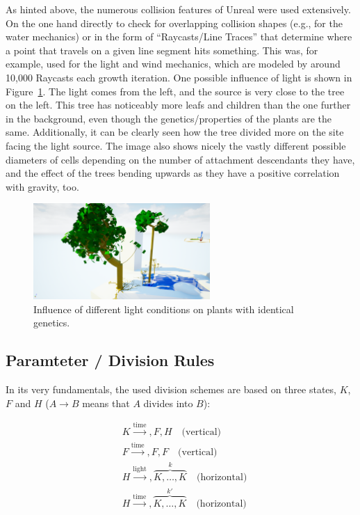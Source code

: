 \documentclass[11pt, abstract=on]{scrartcl}
\begin{document}
As hinted above, the numerous collision features of Unreal were used extensively. On the one hand directly to check for overlapping collision shapes (e.g., for the water mechanics) or in the form of ``Raycasts/Line Traces'' that determine where a point that travels on a given line segment hits something. This was, for example, used for the light and wind mechanics, which are modeled by around 10,000 Raycasts each growth iteration.
One possible influence of light is shown in Figure~\ref{fig:GrowToLight}. The light comes from the left, and the source is very close to the tree on the left. This tree has noticeably more leafs and children than the one further in the background, even though the genetics/properties of the plants are the same. Additionally, it can be clearly seen how the tree divided more on the site facing the light source. The image also shows nicely the vastly different possible diameters of cells depending on the number of attachment descendants they have, and the effect of the trees bending upwards as they have a positive correlation with gravity, too. 

\begin{figure}
 	 \centering
 	    \includegraphics[width=0.6\textwidth]{SS_GrowToLight.png}
 	 \caption{Influence of different light conditions on plants with identical genetics.}
 	 \label{fig:GrowToLight}
\end{figure}

\subsection{Paramteter / Division Rules}
In its very fundamentals, the used division schemes are based on three states, $K$, $F$ and $H$ ($A \rightarrow B$ means that $A$ divides into $B$):

\begin{align}
	&K \xrightarrow {\text{time}}, F, H \quad \text{(vertical)} \label{eq:K} \\
	&F \xrightarrow {\text{time}}, F, F \quad \text{(vertical)} \label{eq:F}\\
	&H \xrightarrow {\text{light}}, \overbrace{ K, \ldots , K}^{k} \quad \text{(horizontal)}  \label{eq:HLight} \\
	&H \xrightarrow {\text{time}}, \overbrace{ K, \ldots , K}^{k'} \quad \text{(horizontal)} \label{eq:HTime}
\end{align}
\end{document}
